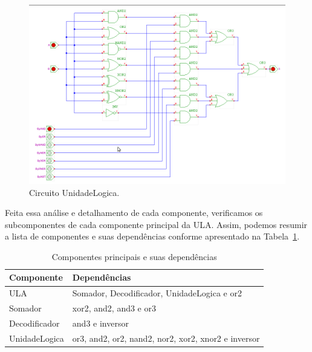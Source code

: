 \documentclass[a4paper,11pt]{report}
\begin{document}
\begin{figure}[H]
\centering
\includegraphics[width=1\textwidth]{figuras/unidadeLogica.png}
\caption{Circuito UnidadeLogica.}
\label{fig:UnidadeLogica}
\end{figure}

Feita essa análise e detalhamento de cada componente, verificamos os subcomponentes de cada componente principal da ULA. Assim, podemos resumir a lista de componentes e suas dependências conforme apresentado na Tabela~\ref{tab:dep_componentes}.

\begin{table}[H]
\centering
\caption{Componentes principais e suas dependências} %
\begin{tabular}{ll} %
\hline %
Componente & Dependências \\ %
\hline
\hline
ULA & Somador, Decodificador, UnidadeLogica e or2 \\
Somador & xor2, and2, and3 e or3 \\
Decodificador & and3 e inversor \\
UnidadeLogica & or3, and2, or2, nand2, nor2, xor2, xnor2 e inversor \\
\hline
\end{tabular}
\label{tab:dep_componentes}
\end{table} 
\end{document}
